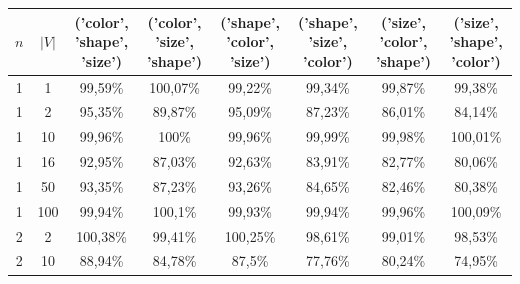 \begin{table}[ht]
    \centering
    \begin{tabular}{cc|c|c|c|c|c|c}
        \toprule
        $n$ & $|V|$ & \textbf{('color', 'shape', 'size')} & \textbf{('color', 'size', 'shape')} & \textbf{('shape', 'color', 'size')} & \textbf{('shape', 'size', 'color')} & \textbf{('size', 'color', 'shape')} & \textbf{('size', 'shape', 'color')} \\\midrule
        {1} & {1}   & {99,59\%}                           & {100,07\%}                          & {99,22\%}                           & {99,34\%}                           & {99,87\%}                           & {99,38\%}                           \\
        {1} & {2}   & {95,35\%}                           & {89,87\%}                           & {95,09\%}                           & {87,23\%}                           & {86,01\%}                           & {84,14\%}                           \\
        {1} & {10}  & {99,96\%}                           & {100\%}                             & {99,96\%}                           & {99,99\%}                           & {99,98\%}                           & {100,01\%}                          \\
        {1} & {16}  & {92,95\%}                           & {87,03\%}                           & {92,63\%}                           & {83,91\%}                           & {82,77\%}                           & {80,06\%}                           \\
        {1} & {50}  & {93,35\%}                           & {87,23\%}                           & {93,26\%}                           & {84,65\%}                           & {82,46\%}                           & {80,38\%}                           \\
        {1} & {100} & {99,94\%}                           & {100,1\%}                           & {99,93\%}                           & {99,94\%}                           & {99,96\%}                           & {100,09\%}                          \\
        {2} & {2}   & {100,38\%}                          & {99,41\%}                           & {100,25\%}                          & {98,61\%}                           & {99,01\%}                           & {98,53\%}                           \\
        {2} & {10}  & {88,94\%}                           & {84,78\%}                           & {87,5\%}                            & {77,76\%}                           & {80,24\%}                           & {74,95\%}                           \\

\end{tabular}
\end{table}
